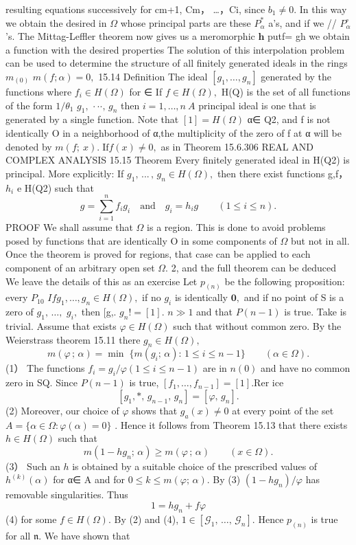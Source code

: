 resulting equations successively for cm+1, Cm， …，Ci, since $b_{1}\neq0.$ In this way we obtain the desired in $\Omega$ whose principal parts are these $P_{\alpha}^{*}$ a's, and if we // $P_{\alpha}^{\circ}$ 's. The Mittag-Leffler theorem now gives us a meromorphic ${\boldsymbol{h}}$ putf= gh we obtain a function with the desired properties The solution of this interpolation problem can be used to determine the structure of all finitely generated ideals in the rings $\scriptstyle{m_{(0)}}$ $m(f;\alpha)=0,$ 15.14 Definition The ideal $[g_{1},\dots,g_{n}]$ generated by the functions where $f_{i}\in H(\Omega)$ for ∈ If $f\in H(\Omega),$ H(Q) is the set of all functions of the form $\scriptstyle{1/\theta_{1}}$ $g_{1},\,\cdot\cdot\cdot,\,g_{n}$ then $i=1,\dots,n\ A$ principal ideal is one that is generated by a single function. Note that $[1]=H(\Omega)$ α∈ Q2, and f is not identically O in a neighborhood of α,the multiplicity of the zero of f at α will be denoted by $m(f;\ x).\;\mathrm{If}f(x)\neq0,$ as in Theorem 15.6.306 REAL AND COMPLEX ANALYSIS 15.15 Theorem Every finitely generated ideal in H(Q2) is principal. More explicitly: If $g_{1},\,...\,,\,g_{n}\in H(\Omega),$ then there exist functions g,f， $h_{i}$ e H(Q2) such that $$ g=\sum_{i=1}^{n}f_{i}g_{i}\quad{\mathrm{and}}\quad g_{i}=h_{i}g\qquad(1\leq i\leq n). $$ PROOF We shall assume that $\Omega$ is a region. This is done to avoid problems posed by functions that are identically O in some components of $\Omega$ but not in all. Once the theorem is proved for regions, that case can be applied to each component of an arbitrary open set $\Omega.$ 2, and the full theorem can be deduced We leave the details of this as an exercise Let $\scriptstyle{p_{(n)}}$ be the following proposition: every $\scriptstyle P_{10}$ $I f g_{1},\ldots,g_{n}\in H(\Omega),$ if no $g_{i}$ is identically ${\boldsymbol{0}},$ and if no point of S is a zero of $g_{1},\,\ldots,$ ${g}_{i},$ then [g,. $g_{n}!=[1].$ $\scriptstyle n\gg1$ and that $P(n-1)$ is true. Take is trivial. Assume that exists $\varphi\in H(\Omega)$ such that without common zero. By the Weierstrass theorem 15.11 there $g_{n}\in H(\Omega),$ $$ m(\varphi\,;\,\alpha)=\operatorname*{min}\;\{m(g_{i};\,\alpha)\!:\,1\leq i\leq n-1\}\qquad(\alpha\in\Omega). $$ (1） The functions $f_{i}=g_{i}/\varphi\left(1\leq i\leq n-1\right)$ are in $\scriptstyle n(0)$ and have no common zero in SQ. Since $P(n-1)$ is true, $[f_{1},\dots,f_{n-1}]=[1].\mathrm{Rer}$ ice $$ [g_{1},\ast,\,g_{n-1},\,g_{n}]=[\varphi,\,g_{n}]. $$ (2) Moreover, our choice of $\varphi$ shows that $g_{a}(x)\neq0$ at every point of the set $A=\{\alpha\in\Omega\colon\varphi(\alpha)=0\}$ . Hence it follows from Theorem 15.13 that there exists $h\in H(\Omega)$ such that $$ m(1-h g_{n};\,\alpha)\geq m(\varphi\,;\,\alpha)\qquad(x\in\Omega). $$ (3） Such an $\boldsymbol{\mathit{h}}$ is obtained by a suitable choice of the prescribed values of $h^{(k)}(\alpha)$ for α∈ A and for $0\leq k\leq m(\varphi;\,\alpha).$ By (3) $(1-h g_{n})/\varphi$ has removable singularities. Thus $$ 1=h g_{n}+f\varphi $$ (4) for some $f\in H(\Omega).$ By (2) and (4), $1\in[{\mathcal{G}}_{1},\,\dots,\,{\mathcal{G}}_{n}].$ Hence $\scriptstyle{p_{(n)}}$ is true for all ${\mathfrak{n}}.$ We have shown that 